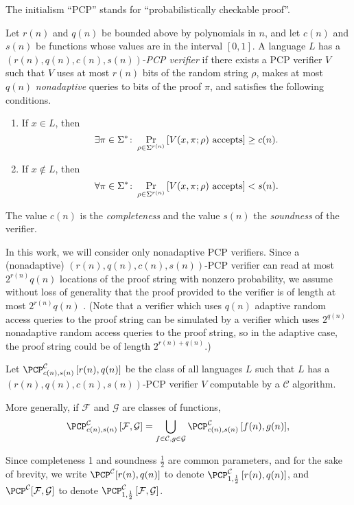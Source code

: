 \documentclass{article}
\newcommand{\PCPcs}[5]{\PCP^{#1}_{#2, #3}\left[#4, #5\right]}
\begin{document}
The initialism ``PCP'' stands for ``probabilistically checkable proof''.

\begin{definition}
  Let $r(n)$ and $q(n)$ be bounded above by polynomials in $n$, and let $c(n)$ and $s(n)$ be functions whose values are in the interval $[0, 1]$.
  A language $L$ has a $(r(n), q(n), c(n), s(n))$-\emph{PCP verifier} if there exists a PCP verifier $V$ such that $V$ uses at most $r(n)$ bits of the random string $\rho$, makes at most $q(n)$ \emph{nonadaptive} queries to bits of the proof $\pi$, and satisfies the following conditions.
  \begin{enumerate}
  \item If $x \in L$, then
    \begin{equation*}
      \exists \pi \in \Sigma^* \colon \Pr_{\rho \in \Sigma^{r(n)}}{\left[V(x, \pi; \rho) \textnormal{ accepts}\right]} \geq c(n).
    \end{equation*}
  \item If $x \notin L$, then
    \begin{equation*}
      \forall \pi \in \Sigma^* \colon \Pr_{\rho \in \Sigma^{r(n)}}{\left[V(x, \pi; \rho) \textnormal{ accepts}\right]} < s(n).
    \end{equation*}
  \end{enumerate}
  The value $c(n)$ is the \emph{completeness} and the value $s(n)$ the \emph{soundness} of the verifier.
\end{definition}

In this work, we will consider only nonadaptive PCP verifiers.
Since a (nonadaptive) $(r(n), q(n), c(n), s(n))$-PCP verifier can read at most $2^{r(n)} q(n)$ locations of the proof string with nonzero probability, we assume without loss of generality that the proof provided to the verifier is of length at most $2^{r(n)} q(n)$ \autocite[Remark~11.6]{ab09}.
(Note that a verifier which uses $q(n)$ adaptive random access queries to the proof string can be simulated by a verifier which uses $2^{q(n)}$ nonadaptive random access queries to the proof string, so in the adaptive case, the proof string could be of length $2^{r(n) + q(n)}$.)

\begin{definition}
  Let $\PCPcs{\mathcal{C}}{c(n)}{s(n)}{r(n)}{q(n)}$ be the class of all languages $L$ such that $L$ has a $(r(n), q(n), c(n), s(n))$-PCP verifier $V$ computable by a $\mathcal{C}$ algorithm.

  More generally, if $\mathcal{F}$ and $\mathcal{G}$ are classes of functions,
  \begin{equation*}
    \PCPcs{\mathcal{C}}{c(n)}{s(n)}{\mathcal{F}}{\mathcal{G}} = \bigcup_{f \in \mathcal{C}, g \in \mathcal{G}}{\PCPcs{\mathcal{C}}{c(n)}{s(n)}{f(n)}{g(n)}},
    \end{equation*}

  Since completeness 1 and soundness $\frac{1}{2}$ are common parameters, and for the sake of brevity, we write $\PCP^{\mathcal{C}}[r(n), q(n)]$ to denote $\PCPcs{\mathcal{C}}{1}{\frac{1}{2}}{r(n)}{q(n)}$, and $\PCP^{\mathcal{C}}[\mathcal{F}, \mathcal{G}]$ to denote $\PCPcs{\mathcal{C}}{1}{\frac{1}{2}}{\mathcal{F}}{\mathcal{G}}$.
\end{definition}
\end{document}
